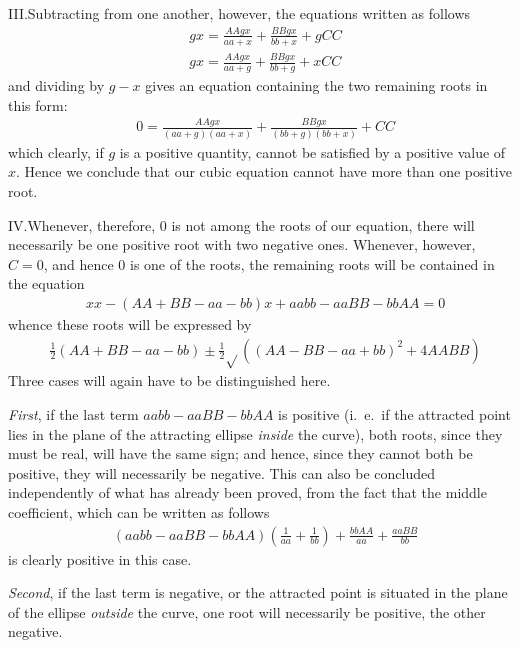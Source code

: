 III.\quad Subtracting from one another, however, the equations written as follows
\[
\begin{aligned}
&gx=\frac{AAgx}{aa+x}+\frac{BBgx}{bb+x}+gCC\\[6pt]
&gx=\frac{AAgx}{aa+g}+\frac{BBgx}{bb+g}+xCC
\end{aligned}
\]
and dividing by \(g-x\) gives an equation containing the two remaining roots in this form:
\[
\begin{aligned}
&0=\frac{AAgx}{(aa+g)(aa+x)}+\frac{BBgx}{(bb+g)(bb+x)}+CC
\end{aligned}
\]
which clearly, if \(g\) is a positive quantity, cannot be satisfied by a positive value of \(x\). Hence we conclude that our cubic equation cannot have more than one positive root.
\par
{}
IV.\quad Whenever, therefore, \(0\) is not among the roots of our equation, there will necessarily be one positive root with two negative ones. Whenever, however, \(C=0\), and hence \(0\) is one of the roots, the remaining roots will be contained in the equation
\[
\begin{aligned}
&xx-(AA+BB-aa-bb)x+aabb-aaBB-bbAA=0
\end{aligned}
\]
whence these roots will be expressed by
\[
\begin{aligned}
&\frac12(AA+BB-aa-bb)\pm\frac12\surd\!\left((AA-BB-aa+bb)^2+4AABB\right)
\end{aligned}
\]
Three cases will again have to be distinguished here.

\textit{First}, if the last term \(aabb-aaBB-bbAA\) is positive (i.\ e.\ if the attracted point lies in the plane of the attracting ellipse \textit{inside} the curve), both roots, since they must be real, will have the same sign; and hence, since they cannot both be positive, they will necessarily be negative. This can also be concluded independently of what has already been proved, from the fact that the middle coefficient, which can be written as follows
\[
\begin{aligned}
&(aabb-aaBB-bbAA)\left(\frac1{aa}+\frac1{bb}\right)+\frac{bbAA}{aa}+\frac{aaBB}{bb}
\end{aligned}
\]
is clearly positive in this case.

\textit{Second}, if the last term is negative, or the attracted point is situated in the plane of the ellipse \textit{outside} the curve, one root will necessarily be positive, the other negative.

